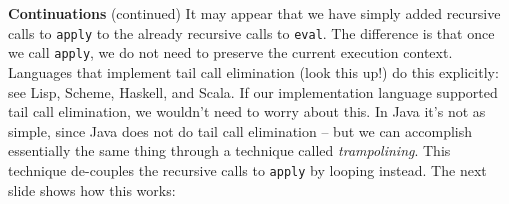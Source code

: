 \begin{minipage}[t]{\sw}
\slidenumber
\LARGE
{\bf Continuations} (continued)\exx
It may appear that we have simply added recursive calls to \verb'apply'
to the already recursive calls to \verb'eval'.
The difference is that once we call \verb'apply',
we do not need to preserve the current execution context.
Languages that implement tail call elimination (look this up!)
do this explicitly: see Lisp, Scheme, Haskell, and Scala.\exx
If our implementation language supported tail call elimination,
we wouldn't need to worry about this.
In Java it's not as simple,
since Java does not do tail call elimination --
but we can accomplish essentially the same thing
through a technique called {\em trampolining}.
This technique de-couples the recursive calls to \verb'apply'
by looping instead.  The next slide shows how this works:
\end{minipage}
